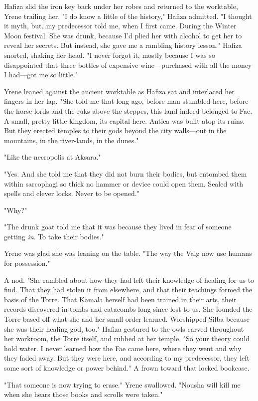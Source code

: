 Hafiza slid the iron key back under her robes and returned to the worktable, Yrene trailing her.
"I do know a little of the history," Hafiza admitted.
"I thought it myth, but\ldots my predecessor told me, when I first came.
During the Winter Moon festival.
She was drunk, because I'd plied her with alcohol to get her to reveal her secrets.
But instead, she gave me a rambling history lesson."
Hafiza snorted, shaking her head.
"I never forgot it, mostly because I was so disappointed that three bottles of expensive wine---purchased with all the money I had---got me so little."

Yrene leaned against the ancient worktable as Hafiza sat and interlaced her fingers in her lap.
"She told me that long ago, before man stumbled here, before the horse-lords and the ruks above the steppes, this land indeed belonged to Fae.
A small, pretty little kingdom, its capital here.
Antica was built atop its ruins.
But they erected temples to their gods beyond the city walls---out in the mountains, in the river-lands, in the dunes."

"Like the necropolis at Aksara."

"Yes.
And she told me that they did not burn their bodies, but entombed them within sarcophagi so thick no hammer or device could open them.
Sealed with spells and clever locks.
Never to be opened."

"Why?"

"The drunk goat told me that it was because they lived in fear of someone getting \emph{in}.
To take their bodies."

Yrene was glad she was leaning on the table.
"The way the Valg now use humans for possession."

A nod.
"She rambled about how they had left their knowledge of healing for us to find.
That they had stolen it from elsewhere, and that their teachings formed the basis of the Torre.
That Kamala herself had been trained in their arts, their records discovered in tombs and catacombs long since lost to us.
She founded the Torre based off what she and her small order learned.
Worshipped Silba because she was their healing god, too."
Hafiza gestured to the owls carved throughout her workroom, the Torre itself, and rubbed at her temple.
"So your theory could hold water.
I never learned how the Fae came here, where they went and why they faded away.
But they were here, and according to my predecessor, they left some sort of knowledge or power behind."
A frown toward that locked bookcase.

"That someone is now trying to erase."
Yrene swallowed.
"Nousha will kill me when she hears those books and scrolls were taken."

